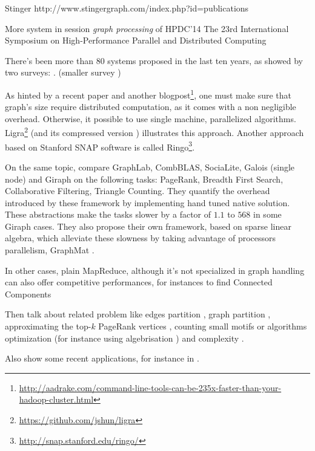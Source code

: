 Stinger http://www.stingergraph.com/index.php?id=publications

More system in session \emph{graph processing} of HPDC'14 The 23rd International
Symposium on High-Performance Parallel and Distributed Computing 

There's been more than 80 systems proposed in the last ten years, as showed by
two surveys: \autocites{Doekemeijer2014}{McCune2015}.
(smaller survey \autocite{Aridhi2016})

As hinted by a recent paper\autocite{COST15} and another
blogpost\footnote{\href{http://aadrake.com/command-line-tools-can-be-235x-faster-than-your-hadoop-cluster.html}%
	{http://aadrake.com/command-line-tools-can-be-235x-faster-than-your-hadoop-cluster.html}},
one must make sure that graph's size require distributed computation, as it
comes with a non negligible overhead. Otherwise, it possible to use single
machine, parallelized algorithms.
Ligra\footnote{\href{https://github.com/jshun/ligra}%
	{https://github.com/jshun/ligra}} \autocite{Ligra13} (and its compressed
version \autocite{Ligra15}) illustrates this approach. Another approach based
on Stanford SNAP software is called Ringo\footnote{\href{http://snap.stanford.edu/ringo/}%
	{http://snap.stanford.edu/ringo/}}\autocite{Ringo15}.

On the same topic, \textcite{NativeBenchmark14} compare GraphLab, CombBLAS,
SociaLite, Galois (single node) and Giraph on the following tasks: PageRank,
Breadth First Search, Collaborative Filtering, Triangle Counting. They quantify
the overhead introduced by these framework by implementing hand tuned native
solution. These abstractions make the tasks slower by a factor of $1.1$ to
$568$ in some Giraph cases. They also propose their own framework, based on
sparse linear algebra, which alleviate these slowness by taking advantage of
processors parallelism, GraphMat \autocite{GraphMat15}.

In other cases, plain MapReduce\autocite{MapReduce04}, although it's not
specialized in graph handling can also offer competitive performances, for
instances to find Connected Components
\autocites{Kardes2014}{Qin2014}{Kiveris2014}

Then talk about related problem like edges partition \autocite{Bourse2014a},
graph partition \autocites{Partition13}{Tsourakakis2014}{Partition14}{Li2015a},
approximating the top-$k$ PageRank vertices \autocite{Mitliagkas2015},
counting small motifs \autocite{Elenberg2015} or
algorithms optimization \autocites{Salihoglu14}{Salihoglu2014b} (for instance
using algebrisation \autocite{Kaski2015}) and complexity
\autocite{ComputationBounds14,Pandurangan2015}.

Also show some recent applications, for instance in \pcc{}
\autocites{Bonchi2012}{Chierichetti2014}.
\autocite{Quick2012}
